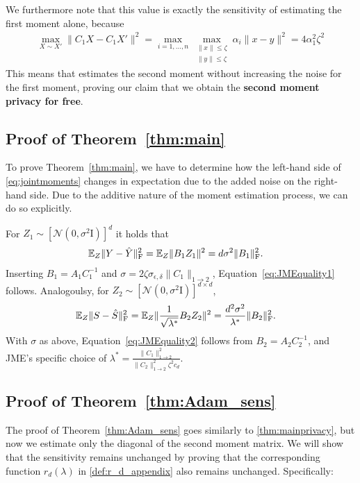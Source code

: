We furthermore note that this value is exactly the sensitivity of estimating 
the first moment alone, because 
%
\begin{align}
\max_{X\sim X'}\|C_1X\!-\!C_1X'\|^2 \!=\! \max_{i=1,\dots,n}\max_{\substack{\|x\|\leq \zeta\\\|y\|\leq \zeta}}
\alpha_i\|x-y\|^2 = 4\alpha_1^2\zeta^2
\end{align}
%
This means that \acronym estimates the second moment without increasing the noise for 
the first moment, proving our claim that we obtain the \textbf{second moment privacy for free}. 
  
\subsection{Proof of Theorem~\ref{thm:main}}
To prove Theorem~\ref{thm:main}, we have to determine how the left-hand side of \eqref{eq:jointmoments} changes
in expectation due to the added noise on the right-hand
side. Due to the additive nature of the moment estimation
process, we can do so explicitly. 

For $Z_1\sim[\mathcal{N}(0,\sigma^2\text{I})]^{d}$ it holds that 
%
\begin{align}
    \mathbb{E}_{Z}\|Y - \hat{Y}\|^2_{\text{F}} &=\mathbb{E}_{Z} \|B_1 Z_1\|^2
    = d\sigma^2 \|B_1\|^2_{\text{F}}.
\end{align}
Inserting $B_1=A_1C_1^{-1}$ and $\sigma=2\zeta\sigma_{\epsilon,\delta}\|C_1\|_{1\to 2}$, 
Equation~\eqref{eq:JMEquality1} follows.
%
Analogoulsy, for $Z_2\sim[\mathcal{N}(0,\sigma^2\text{I})]^{d\times d}$, 
\begin{align}
    \mathbb{E}_{Z}\|S - \hat{S}\|^2_{\text{F}} &=\mathbb{E}_{Z} \|\frac{1}{\sqrt{\lambda^*}}B_2 Z_2\|^2
    = \frac{d^2\sigma^2}{\lambda^*}\|B_2\|^2_{\text{F}}.
\end{align}
With $\sigma$ as above, Equation~\eqref{eq:JMEquality2} follows from $B_2=A_2C_2^{-1}$, 
and JME's specific choice of $\lambda^*=\frac{\|C_1\|^2_{1\to 2}}{\|C_2\|^2_{1\to 2} \zeta^2 c_d}$.





\subsection{Proof of Theorem~\ref{thm:Adam_sens}}
\label{sec:adam_sens_proof}

The proof of Theorem~\ref{thm:Adam_sens} goes similarly to \ref{thm:mainprivacy}, but now we estimate only the diagonal of the second moment matrix. We will show that the sensitivity remains unchanged by proving that the corresponding function $r_d(\lambda)$ in \eqref{def:r_d_appendix} also remains unchanged. Specifically:


